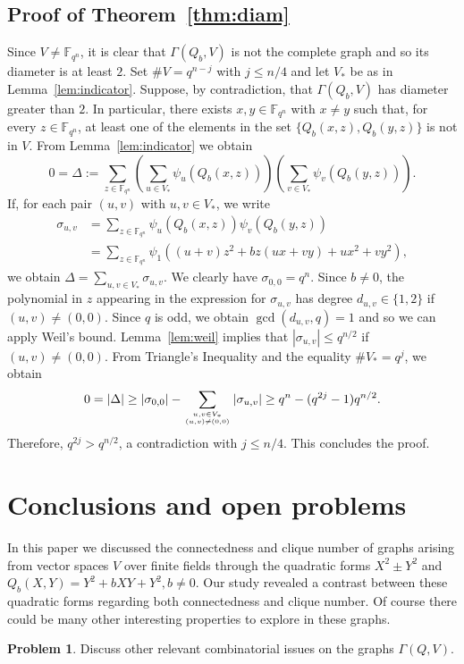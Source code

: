 \documentclass[11pt]{amsart}
\newcommand{\G}{\Gamma}
\newcommand{\F}{\mathbb F}
\theoremstyle{definition}
\newtheorem{problem}[theorem]{Problem}
\theoremstyle{remark}
\begin{document}
\subsection{Proof of Theorem~\ref{thm:diam}}
Since $V\ne \F_{q^n}$, it is clear that $\Gamma(Q_b, V)$ is not the complete graph and so its diameter is at least $2$. Set $\# V=q^{n-j}$ with $j\le n/4$ and let $V_*$ be as in Lemma~\ref{lem:indicator}. Suppose, by contradiction, that $\G(Q_b, V)$ has diameter greater than $2$. In particular, there exists $x, y\in \F_{q^n}$ with $x\ne y$ such that, for every $z\in \F_{q^n}$, at least one of the elements in the set $\{Q_b(x, z), Q_b(y, z)\}$ is not in $V$. From Lemma~\ref{lem:indicator} we obtain
$$0=\Delta:=\sum_{z\in \F_{q^n}}\left(\sum_{u\in V_*}\psi_u(Q_b(x, z))\right)\left(\sum_{v\in V_*}\psi_v(Q_b(y, z))\right).$$
If, for each pair $(u, v)$ with $u, v\in V_*$, we write \begin{align*}\sigma_{u, v}&=\sum_{z\in \F_{q^n}}\psi_{u}(Q_b(x, z))\psi_v(Q_b(y, z))\\&= \sum_{z\in \F_{q^n}}\psi_1((u+v)z^2+bz(ux+vy)+ux^2+vy^2),\end{align*}
we obtain 
$\Delta=\sum_{u, v\in V_*}\sigma_{u, v}$. We clearly have $\sigma_{0, 0}=q^n$. Since $b\ne 0$, the polynomial in $z$ appearing in the expression for $\sigma_{u, v}$ has degree $d_{u, v}\in \{1, 2\}$ if $(u, v)\ne (0, 0)$. Since $q$ is odd, we obtain $\gcd(d_{u, v}, q)=1$ and so we can apply Weil's bound. Lemma~\ref{lem:weil} implies that $|\sigma_{u, v}|\le q^{n/2}$ if $(u, v)\ne (0, 0)$. From Triangle's Inequality and the equality $\# V_*=q^j$, we obtain
$$0=|\Delta|\ge |\sigma_{0, 0}|-\sum_{u, v\in V_*\atop (u, v)\ne (0, 0)}|\sigma_{u, v}|\ge q^n-(q^{2j}-1)q^{n/2}.$$
Therefore, $q^{2j}>q^{n/2}$, a contradiction with $j\le n/4$. This concludes the proof.

\section{Conclusions and open problems}
In this paper we discussed the connectedness and clique number of graphs arising from vector spaces $V$ over finite fields through the quadratic forms $X^2\pm Y^2$ and $Q_b(X, Y)=Y^2+bXY+Y^2, b\ne 0$. Our study revealed a contrast between these quadratic forms regarding both connectedness and clique number. Of course there could be many other interesting properties to explore in these graphs.

\begin{problem}
    Discuss other relevant combinatorial issues on the graphs $\Gamma(Q, V)$.  
\end{problem}
\end{document}

